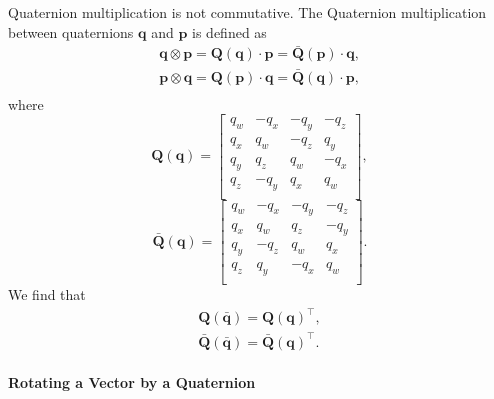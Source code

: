 \documentclass[10pt,a4paper,fleqn]{article}
\newcommand{\qx}[0]{\ensuremath{q_x}}
\newcommand{\qy}[0]{\ensuremath{q_y}}
\newcommand{\qz}[0]{\ensuremath{q_z}}
\newcommand{\qw}[0]{\ensuremath{q_w}}
\newcommand{\bVec}[1]{\mathbf{#1}}
\begin{document}
Quaternion multiplication is not commutative. 
The Quaternion multiplication between quaternions $\bVec{q}$ and $\bVec{p}$ is defined as
%
\begin{align}
\bVec{q} \otimes \bVec{p} = \bVec{Q}\left(\bVec{q}\right) \cdot \bVec{p} = \bar{\bVec{Q}}\left(\bVec{p}\right) \cdot \bVec{q},\\
%
\bVec{p} \otimes \bVec{q} = \bVec{Q}\left(\bVec{p}\right) \cdot \bVec{q} = \bar{\bVec{Q}}\left(\bVec{q}\right)\cdot \bVec{p},\\
\end{align}
%
where 
%
\begin{equation}
\bVec{Q}\left(\bVec{q}\right) = 
\begin{bmatrix} 
	\qw & -\qx & -\qy & -\qz \\ 
	\qx &  \qw & -\qz &  \qy \\
	\qy &  \qz &  \qw & -\qx \\
	\qz & -\qy &  \qx &  \qw \\
\end{bmatrix},
\end{equation}
%
\begin{equation}
\bar{\bVec{Q}}\left(\bVec{q}\right) = 
\begin{bmatrix} 
	\qw & -\qx & -\qy & -\qz \\ 
	\qx &  \qw &  \qz & -\qy \\
	\qy & -\qz &  \qw &  \qx \\
	\qz &  \qy & -\qx &  \qw \\
\end{bmatrix}.
\end{equation}
%
We find that
%
\begin{align}
\bVec{Q}\left(\bar{\bVec{q}}\right) = \bVec{Q}\left(\bVec{q}\right)^{\top},\\
\bar{\bVec{Q}}\left(\bar{\bVec{q}}\right) = \bar{\bVec{Q}}\left(\bVec{q}\right)^{\top}.
\end{align}

\paragraph{Rotating a Vector by a Quaternion}
\end{document}
